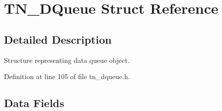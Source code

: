 \hypertarget{structTN__DQueue}{}\section{T\+N\+\_\+\+D\+Queue Struct Reference}
\label{structTN__DQueue}


\subsection{Detailed Description}
Structure representing data queue object. 

Definition at line 105 of file tn\+\_\+dqueue.\+h.

\subsection*{Data Fields}

